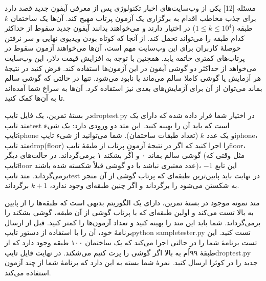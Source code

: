 ‌مسئله [12]
یکی از وب‌سایت‌های اخبار تکنولوژی پس از معرفی آیفون جدید قصد دارد برای جذب مخاطب اقدام به برگزاری یک آزمون پرتاب مهیج کند. آن‌ها یک ساختمان $k$ طبقه ($1\leq k\leq 10^4$) در اختیار دارند و می‌خواهند بدانند آیفون جدید سقوط از حداکثر کدام طبقه را می‌تواند تحمل کند. از آنجا که کوتاه بودن ویدیوی نهایی و سر نرفتن حوصلۀ کاربران برای این وب‌سایت مهم است، آن‌ها می‌خواهند آزمون سقوط در پرتاب‌های کمتری خاتمه یابد. همچنین با توجه به افزایش قیمت دلار، این وب‌سایت می‌خواهد از حداکثر دو گوشی آیفون در این آزمون‌ها استفاده کند.
فرض کنید در نتیجۀ هر آزمایش یا گوشی کاملا سالم می‌ماند یا نابود می‌شود. تنها در حالتی که گوشی سالم بماند می‌توان از آن برای آزمایش‌های بعدی نیز استفاده کرد.
آن‌ها به سراغ شما آمده‌اند تا به آن‌ها کمک کنید.

در بستۀ تمرین، یک فایل ‌تایپ{droptest.py} در اختیار شما قرار داده شده که دارای یک متد ‌تایپ{test} است که باید آن را بهینه کنید. این متد دو ورودی دارد: یک شیء ‌تایپ{iphone} و یک عدد $k$ (تعداد طبقات ساختمان). شما می‌توانید از شیء ‌تایپ{iphone}، متد ‌تایپ{drop(floor)} را اجرا کنید که اگر در نتیجۀ آزمونِ پرتاب از طبقۀ ‌تایپ{floor}، گوشی سالم بماند ۰ و اگر بشکند ۱ برمی‌گرداند. در حالت‌های دیگر (مثل وقتی که ‌تایپ{floor} عدد معتبری نباشد یا دو گوشی قبلاً شکسته شده باشند)، این تابع $-1$ برمی‌گرداند. متد ‌تایپ{test} در نهایت باید پایین‌ترین طبقه‌ای که پرتاب گوشی از آن منجر به شکستن می‌شود را برگرداند و اگر چنین طبقه‌ای وجود ندارد، $k+1$ برگرداند.

متد نمونه موجود در بستۀ تمرین، دارای یک الگوریتم بدیهی است که طبقه‌ها را از پایین به بالا تست می‌کند و اولین طبقه‌ای که با پرتاب گوشی از آن طبقه، گوشی بشکند را برمی‌گرداند. شما باید این متد را بهینه کنید و تعداد آزمون‌ها را کمتر کنید. قبل از ارسال برنامۀ خود، آن را با استفاده از دستور ‌تایپ{python sampletester.py} تست کنید. این تست برنامۀ شما را در حالتی اجرا می‌کند که یک ساختمان ۱۰۰ طبقه وجود دارد که از طبقۀ ۹۹اُم به بالا اگر گوشی را پرت کنیم می‌شکند. در نهایت فایل ‌تایپ{droptest.py} جدید را در کوئرا ارسال کنید. نمرۀ شما بسته به این دارد که برنامۀ شما از چند آزمون استفاده می‌کند. 


